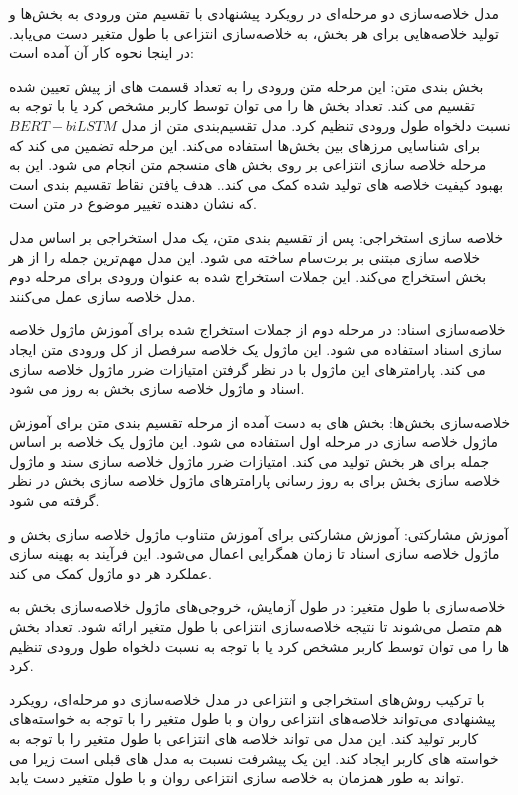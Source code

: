 مدل خلاصه‌سازی دو مرحله‌ای در رویکرد پیشنهادی با تقسیم متن ورودی به بخش‌ها و تولید خلاصه‌هایی برای هر بخش، به خلاصه‌سازی انتزاعی با طول متغیر دست می‌یابد. در اینجا نحوه کار آن آمده است:

بخش بندی متن: این مرحله متن ورودی را به تعداد قسمت های از پیش تعیین شده تقسیم می کند. تعداد بخش ها را می توان توسط کاربر مشخص کرد یا با توجه به نسبت دلخواه طول ورودی تنظیم کرد. مدل تقسیم‌بندی متن از مدل $ BERT-biLSTM $ برای شناسایی مرزهای بین بخش‌ها استفاده می‌کند. این مرحله تضمین می کند که مرحله خلاصه سازی انتزاعی بر روی بخش های منسجم متن انجام می شود. این به بهبود کیفیت خلاصه های تولید شده کمک می کند.. هدف یافتن نقاط تقسیم بندی است که نشان دهنده تغییر موضوع در متن است.

خلاصه سازی استخراجی: پس از تقسیم بندی متن، یک مدل استخراجی بر اساس مدل خلاصه سازی مبتنی بر  برت‌سام
ساخته می شود. این مدل مهم‌ترین جمله را از هر بخش استخراج می‌کند. این جملات استخراج شده به عنوان ورودی برای مرحله دوم مدل خلاصه سازی عمل می‌کنند.

خلاصه‌سازی اسناد: در مرحله دوم از جملات استخراج شده برای آموزش ماژول خلاصه سازی اسناد استفاده می شود. این ماژول یک خلاصه سرفصل از کل ورودی متن ایجاد می کند. پارامترهای این ماژول با در نظر گرفتن امتیازات ضرر ماژول خلاصه سازی اسناد و ماژول خلاصه سازی بخش به روز می شود.

خلاصه‌سازی بخش‌ها: بخش های به دست آمده از مرحله تقسیم بندی متن برای آموزش ماژول خلاصه سازی در مرحله اول استفاده می شود. این ماژول یک خلاصه بر اساس جمله برای هر بخش تولید می کند. امتیازات ضرر ماژول خلاصه سازی سند و ماژول خلاصه سازی بخش برای به روز رسانی پارامترهای ماژول خلاصه سازی بخش در نظر گرفته می شود.

آموزش مشارکتی: آموزش مشارکتی برای آموزش متناوب ماژول خلاصه سازی بخش و ماژول خلاصه سازی اسناد تا زمان همگرایی اعمال می‌شود. این فرآیند به بهینه سازی عملکرد هر دو ماژول کمک می کند.

خلاصه‌سازی با طول متغیر: در طول آزمایش، خروجی‌های ماژول خلاصه‌سازی بخش به هم متصل می‌شوند تا نتیجه خلاصه‌سازی انتزاعی با طول متغیر ارائه شود. تعداد بخش ها را می توان توسط کاربر مشخص کرد یا با توجه به نسبت دلخواه طول ورودی تنظیم کرد.

با ترکیب روش‌های استخراجی و انتزاعی در مدل خلاصه‌سازی دو مرحله‌ای، رویکرد پیشنهادی می‌تواند خلاصه‌های انتزاعی روان و با طول متغیر را با توجه به خواسته‌های کاربر تولید کند.
این مدل می تواند خلاصه های انتزاعی با طول متغیر را با توجه به خواسته های کاربر ایجاد کند. این یک پیشرفت نسبت به مدل های قبلی است زیرا می تواند به طور همزمان به خلاصه سازی انتزاعی روان و با طول متغیر دست یابد.






